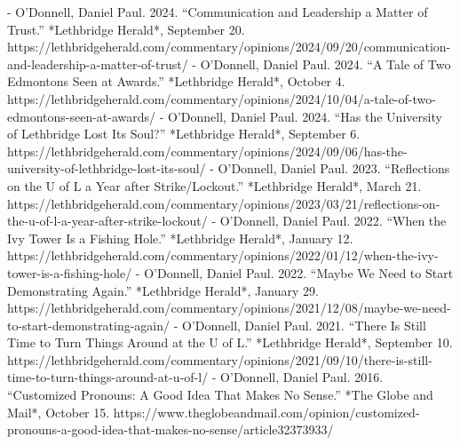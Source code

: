 - O’Donnell, Daniel Paul. 2024. “Communication and Leadership a Matter of Trust.” *Lethbridge Herald*, September 20. https:/\allowbreak{}/\allowbreak{}lethbridgeherald.com/\allowbreak{}commentary/\allowbreak{}opinions/\allowbreak{}2024/\allowbreak{}09/\allowbreak{}20/\allowbreak{}communication-and-leadership-a-matter-of-trust/\allowbreak{}
- O’Donnell, Daniel Paul. 2024. “A Tale of Two Edmontons Seen at Awards.” *Lethbridge Herald*, October 4. https:/\allowbreak{}/\allowbreak{}lethbridgeherald.com/\allowbreak{}commentary/\allowbreak{}opinions/\allowbreak{}2024/\allowbreak{}10/\allowbreak{}04/\allowbreak{}a-tale-of-two-edmontons-seen-at-awards/\allowbreak{}
- O’Donnell, Daniel Paul. 2024. “Has the University of Lethbridge Lost Its Soul?” *Lethbridge Herald*, September 6. https:/\allowbreak{}/\allowbreak{}lethbridgeherald.com/\allowbreak{}commentary/\allowbreak{}opinions/\allowbreak{}2024/\allowbreak{}09/\allowbreak{}06/\allowbreak{}has-the-university-of-lethbridge-lost-its-soul/\allowbreak{}
- O’Donnell, Daniel Paul. 2023. “Reflections on the U of L a Year after Strike/\allowbreak{}Lockout.” *Lethbridge Herald*, March 21. https:/\allowbreak{}/\allowbreak{}lethbridgeherald.com/\allowbreak{}commentary/\allowbreak{}opinions/\allowbreak{}2023/\allowbreak{}03/\allowbreak{}21/\allowbreak{}reflections-on-the-u-of-l-a-year-after-strike-lockout/\allowbreak{}
- O’Donnell, Daniel Paul. 2022. “When the Ivy Tower Is a Fishing Hole.” *Lethbridge Herald*, January 12. https:/\allowbreak{}/\allowbreak{}lethbridgeherald.com/\allowbreak{}commentary/\allowbreak{}opinions/\allowbreak{}2022/\allowbreak{}01/\allowbreak{}12/\allowbreak{}when-the-ivy-tower-is-a-fishing-hole/\allowbreak{}
- O’Donnell, Daniel Paul. 2022. “Maybe We Need to Start Demonstrating Again.” *Lethbridge Herald*, January 29. https:/\allowbreak{}/\allowbreak{}lethbridgeherald.com/\allowbreak{}commentary/\allowbreak{}opinions/\allowbreak{}2021/\allowbreak{}12/\allowbreak{}08/\allowbreak{}maybe-we-need-to-start-demonstrating-again/\allowbreak{}
- O’Donnell, Daniel Paul. 2021. “There Is Still Time to Turn Things Around at the U of L.” *Lethbridge Herald*, September 10. https:/\allowbreak{}/\allowbreak{}lethbridgeherald.com/\allowbreak{}commentary/\allowbreak{}opinions/\allowbreak{}2021/\allowbreak{}09/\allowbreak{}10/\allowbreak{}there-is-still-time-to-turn-things-around-at-u-of-l/\allowbreak{}
- O’Donnell, Daniel Paul. 2016. “Customized Pronouns: A Good Idea That Makes No Sense.” *The Globe and Mail*, October 15. https:/\allowbreak{}/\allowbreak{}www.theglobeandmail.com/\allowbreak{}opinion/\allowbreak{}customized-pronouns-a-good-idea-that-makes-no-sense/\allowbreak{}article32373933/\allowbreak{}
